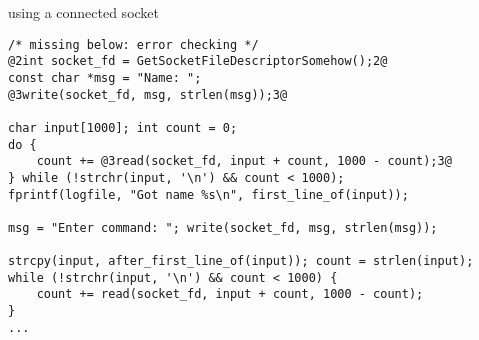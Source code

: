 \begin{frame}[fragile]{using a connected socket}
\begin{lstlisting}
/* missing below: error checking */
@2int socket_fd = GetSocketFileDescriptorSomehow();2@
const char *msg = "Name: ";
@3write(socket_fd, msg, strlen(msg));3@

char input[1000]; int count = 0;
do {
    count += @3read(socket_fd, input + count, 1000 - count);3@
} while (!strchr(input, '\n') && count < 1000);
fprintf(logfile, "Got name %s\n", first_line_of(input));

msg = "Enter command: "; write(socket_fd, msg, strlen(msg));

strcpy(input, after_first_line_of(input)); count = strlen(input);
while (!strchr(input, '\n') && count < 1000) {
    count += read(socket_fd, input + count, 1000 - count);
} 
...
\end{lstlisting}
\end{frame}
